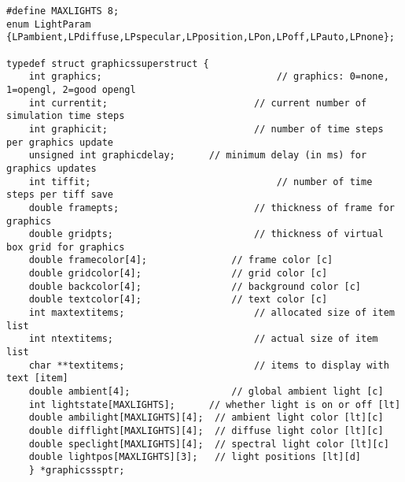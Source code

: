 \documentclass {scrbook}
\begin{document}
\begin{lstlisting}
#define MAXLIGHTS 8;
enum LightParam {LPambient,LPdiffuse,LPspecular,LPposition,LPon,LPoff,LPauto,LPnone};

typedef struct graphicssuperstruct {
	int graphics;								// graphics: 0=none, 1=opengl, 2=good opengl
	int currentit;							// current number of simulation time steps
	int graphicit;							// number of time steps per graphics update
	unsigned int graphicdelay;		// minimum delay (in ms) for graphics updates
	int tiffit;									// number of time steps per tiff save
	double framepts;						// thickness of frame for graphics
	double gridpts;							// thickness of virtual box grid for graphics
	double framecolor[4];				// frame color [c]
	double gridcolor[4];				// grid color [c]
	double backcolor[4];				// background color [c]
	double textcolor[4];				// text color [c]
	int maxtextitems;						// allocated size of item list
	int ntextitems;							// actual size of item list
	char **textitems;						// items to display with text [item]
	double ambient[4];					// global ambient light [c]
	int lightstate[MAXLIGHTS];		// whether light is on or off [lt]
	double ambilight[MAXLIGHTS][4];	 // ambient light color [lt][c]
	double difflight[MAXLIGHTS][4];	 // diffuse light color [lt][c]
	double speclight[MAXLIGHTS][4];	 // spectral light color [lt][c]
	double lightpos[MAXLIGHTS][3];	 // light positions [lt][d]
	} *graphicsssptr;
\end{lstlisting}
\end{document}
